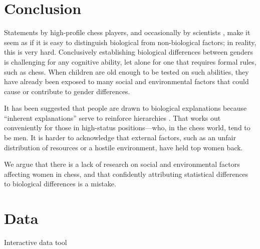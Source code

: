 \documentclass[9pt,twocolumn,twoside,lineno]{pnas-new}
\begin{document}



\section*{Conclusion}
Statements by high-profile chess players, and occasionally by scientists \cite{howard2014jbs}, make it seem as if it is easy to  distinguish biological from non-biological factors; in reality, this is very hard. Conclusively establishing biological differences between genders is challenging for any cognitive ability, let alone for one that requires formal rules, such as chess. When children are old enough to be tested on such abilities, they have already been exposed to many social and environmental factors that could cause or contribute to gender differences. 

It has been suggested that people are drawn to biological explanations because ``inherent explanations” serve to reinforce hierarchies \cite{hussak2015early}. That works out conveniently for those in high-status positions—who, in the chess world, tend to be men. It is harder to acknowledge that external factors, such as an unfair distribution of resources or a hostile environment, have held top women back. 

We argue that there is a lack of research on social and environmental factors affecting women in chess, and that confidently attributing statistical differences to biological differences is a mistake.

\section*{Data}
Interactive data tool
\end{document}

